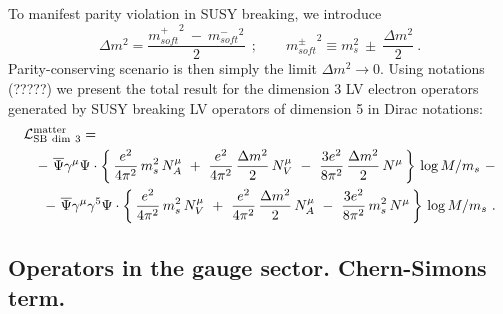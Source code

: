 \documentclass[12pt]{revtex4}
\begin{document}
	To manifest parity violation in SUSY breaking, we introduce 
\begin{equation}
\Delta m^2 = \frac{ {m_{soft}^+}^2 ~ - ~ {m_{soft}^-}^2 }
  {                  2                  }~~;
\qquad
{m_{soft}^\pm}^2 \equiv m_s^2 ~\pm~ \frac{\Delta m^2}{2}~.
\end{equation}
	Parity-conserving scenario is then simply the limit
	$ \Delta m^2 \to 0 $.
	Using notations (?????) we present the total result for the 
	dimension 3 LV electron operators generated by SUSY breaking 
	LV operators of dimension 5 in Dirac notations:
\begin{eqnarray}
\nonumber
\lefteqn{
        \mathcal{L}_{\rm{SB\ dim\ 3}}^{\rm matter} = 
} \\
\nonumber
        &&
-~
\overline{\Psi} \gamma^\mu \Psi \cdot
\left\{\,
        \frac{e^2}{4\pi^2}\, m_s^2\, N_A^\mu 
~+~
\frac{e^2}{4\pi^2}\, \frac{\Delta m^2}{2}\, N_V^\mu 
~-~
\frac{3e^2}{8\pi^2}\, \frac{\Delta m^2}{2}\, N^\mu
       \,
\right\}\, \log M/m_s 
~-
\\
\label{LV_induced_dim3}
&&
-~
\overline{\Psi} \gamma^\mu \gamma^5 \Psi \cdot
\left\{\,
        \frac{e^2}{4\pi^2}\, m_s^2\, N_V^\mu 
~+~
\frac{e^2}{4\pi^2}\, \frac{\Delta m^2}{2}\, N_A^\mu 
~-~
\frac{3e^2}{8\pi^2}\, m_s^2\, N^\mu
       \,
\right\}\, \log M/m_s~.
\end{eqnarray}



\subsection{Operators in the gauge sector. Chern-Simons term.}
\label{SB_gauge_sector}
    
\end{document}
